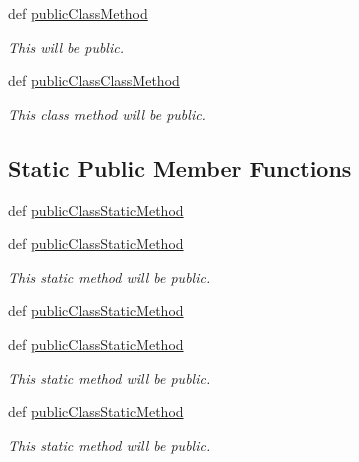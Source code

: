 \begin{DoxyCompactItemize}
def \hyperlink{classdoxypypy_1_1test_1_1sample__privacy_1_1_old_style_sample_a446494775fa39342fabd41ecaeef3fa3}{public\-Class\-Method}
\begin{DoxyCompactList}\small\item\em This will be public. \end{DoxyCompactList}\item 
def \hyperlink{classdoxypypy_1_1test_1_1sample__privacy_1_1_old_style_sample_ade5b72e81a0355d2adc6a071b9328c5a}{public\-Class\-Class\-Method}
\begin{DoxyCompactList}\small\item\em This class method will be public. \end{DoxyCompactList}\end{DoxyCompactItemize}
\subsection*{Static Public Member Functions}
\begin{DoxyCompactItemize}
\item 
def \hyperlink{classdoxypypy_1_1test_1_1sample__privacy_1_1_old_style_sample_a934cce7a7b12a69a5fa88e8a4f6c1c34}{public\-Class\-Static\-Method}
\item 
def \hyperlink{classdoxypypy_1_1test_1_1sample__privacy_1_1_old_style_sample_a934cce7a7b12a69a5fa88e8a4f6c1c34}{public\-Class\-Static\-Method}
\begin{DoxyCompactList}\small\item\em This static method will be public. \end{DoxyCompactList}\item 
def \hyperlink{classdoxypypy_1_1test_1_1sample__privacy_1_1_old_style_sample_a934cce7a7b12a69a5fa88e8a4f6c1c34}{public\-Class\-Static\-Method}
\item 
def \hyperlink{classdoxypypy_1_1test_1_1sample__privacy_1_1_old_style_sample_a934cce7a7b12a69a5fa88e8a4f6c1c34}{public\-Class\-Static\-Method}
\begin{DoxyCompactList}\small\item\em This static method will be public. \end{DoxyCompactList}\item 
def \hyperlink{classdoxypypy_1_1test_1_1sample__privacy_1_1_old_style_sample_a934cce7a7b12a69a5fa88e8a4f6c1c34}{public\-Class\-Static\-Method}
\begin{DoxyCompactList}\small\item\em This static method will be public. \end{DoxyCompactList}\end{DoxyCompactItemize}
